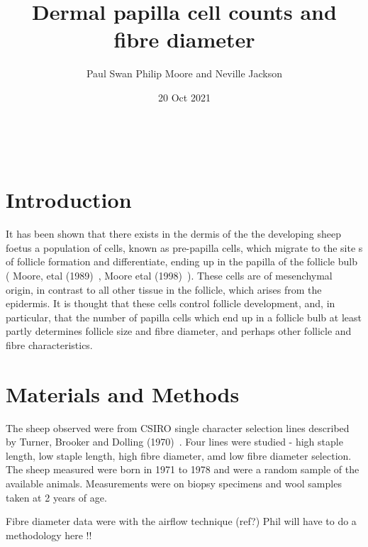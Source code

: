 \documentclass[titlepage]{article}  %
\title{Dermal papilla cell counts and fibre diameter}
\author{Paul Swan Philip Moore and Neville Jackson}
\date{20 Oct 2021}
\begin{document}
 


 
\maketitle      
\tableofcontents

$\newcommand{\E}{\mathrm{E}}$
$\newcommand{\Var}{\mathrm{Var}}$
$\newcommand{\Cov}{\mathrm{Cov}}$ 
$\newcommand{\SD}{\mathrm{SD}}$ 

\clearpage
\section{Introduction} 
It has been shown that there  exists in the dermis of the the developing sheep foetus a population of cells, known as pre-papilla cells, which migrate to the site s of follicle formation and differentiate, ending up in the papilla of the follicle bulb ( Moore, etal (1989)~\cite{moor:89}, Moore etal (1998)~\cite{moor:98}). These cells are of mesenchymal origin, in contrast to all other tissue in the follicle, which arises from the epidermis. It is thought that these cells control follicle development, and, in particular, that the number of papilla cells which end up in a follicle bulb  at least partly determines follicle size and fibre diameter, and perhaps other follicle and fibre characteristics.

\section{Materials and Methods}

The sheep observed were from CSIRO single character selection lines described by Turner, Brooker and Dolling (1970)~\cite{turn:70}. Four lines were studied - high staple length, low staple length, high fibre diameter, amd low fibre diameter selection.  The sheep measured were born in 1971 to 1978 and were a random sample of the available animals. Measurements were on biopsy specimens and wool samples taken at 2 years of age.

Fibre diameter data were with the airflow technique (ref?)
Phil will have to do a methodology here !!
\end{document}

